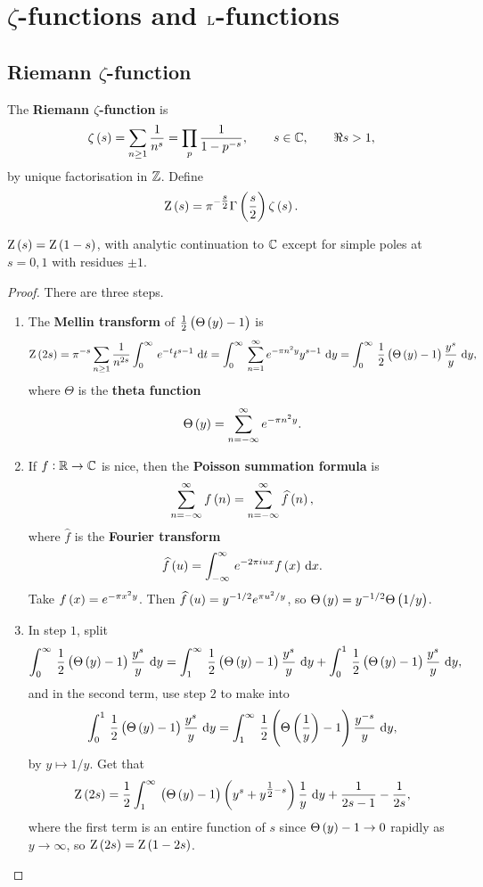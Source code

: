 \pagebreak

\section{\texorpdfstring{$ \zeta $}{Zeta}-functions and \texorpdfstring{$ \mathrm{L} $}{L}-functions}

\subsection{Riemann \texorpdfstring{$ \zeta $}{zeta}-function}


The \textbf{Riemann $ \zeta $-function} is
$$ \zeta\br{s} = \sum_{n \ge 1} \dfrac{1}{n^s} = \prod_p \dfrac{1}{1 - p^{-s}}, \qquad s \in \CC, \qquad \Re s > 1, $$
by unique factorisation in $ \mathbb{Z} $. Define
$$ \Z\br{s} = \pi^{-\tfrac{s}{2}}\Gamma\br{\dfrac{s}{2}}\zeta\br{s}. $$

\begin{theorem}
\label{thm:9.1}
$ \Z\br{s} = \Z\br{1 - s} $, with analytic continuation to $ \mathbb{C} $ except for simple poles at $ s = 0, 1 $ with residues $ \pm 1 $.
\end{theorem}

\begin{proof}
There are three steps.
\begin{enumerate}[leftmargin=0.5in, label=Step \arabic*.]
\item The \textbf{Mellin transform} of $ \tfrac{1}{2}\br{\Theta\br{y} - 1} $ is
$$ \Z\br{2s} = \pi^{-s}\sum_{n \ge 1} \dfrac{1}{n^{2s}}\intd{0}{\infty}{e^{-t}t^{s - 1}}{t} = \intd{0}{\infty}{\sum_{n = 1}^\infty e^{-\pi n^2y}y^{s - 1}}{y} = \intd{0}{\infty}{\dfrac{1}{2}\br{\Theta\br{y} - 1}\dfrac{y^s}{y}}{y}, $$
where $ \Theta $ is the \textbf{theta function}
$$ \Theta\br{y} = \sum_{n = -\infty}^\infty e^{-\pi n^2y}. $$
\item If $ f : \mathbb{R} \to \mathbb{C} $ is nice, then the \textbf{Poisson summation formula} is
$$ \sum_{n = -\infty}^\infty f\br{n} = \sum_{n = -\infty}^\infty \widehat{f}\br{n}, $$
where $ \widehat{f} $ is the \textbf{Fourier transform}
$$ \widehat{f}\br{u} = \intd{-\infty}{\infty}{e^{-2\pi iux}f\br{x}}{x}. $$
Take $ f\br{x} = e^{-\pi x^2y} $. Then $ \widehat{f}\br{u} = y^{-1 / 2}e^{\pi u^2 / y} $, so $ \Theta\br{y} = y^{-1 / 2}\Theta\br{1 / y} $.
\item In step $ 1 $, split
$$ \intd{0}{\infty}{\dfrac{1}{2}\br{\Theta\br{y} - 1}\dfrac{y^s}{y}}{y} = \intd{1}{\infty}{\dfrac{1}{2}\br{\Theta\br{y} - 1}\dfrac{y^s}{y}}{y} + \intd{0}{1}{\dfrac{1}{2}\br{\Theta\br{y} - 1}\dfrac{y^s}{y}}{y}, $$
and in the second term, use step $ 2 $ to make into
$$ \intd{0}{1}{\dfrac{1}{2}\br{\Theta\br{y} - 1}\dfrac{y^s}{y}}{y} = \intd{1}{\infty}{\dfrac{1}{2}\br{\Theta\br{\dfrac{1}{y}} - 1}\dfrac{y^{-s}}{y}}{y}, $$
by $ y \mapsto 1 / y $. Get that
$$ \Z\br{2s} = \dfrac{1}{2}\intd{1}{\infty}{\br{\Theta\br{y} - 1}\br{y^s + y^{\tfrac{1}{2} - s}}\dfrac{1}{y}}{y} + \dfrac{1}{2s - 1} - \dfrac{1}{2s}, $$
where the first term is an entire function of $ s $ since $ \Theta\br{y} - 1 \to 0 $ rapidly as $ y \to \infty $, so $ \Z\br{2s} = \Z\br{1 - 2s} $.
\end{enumerate}
\end{proof}

